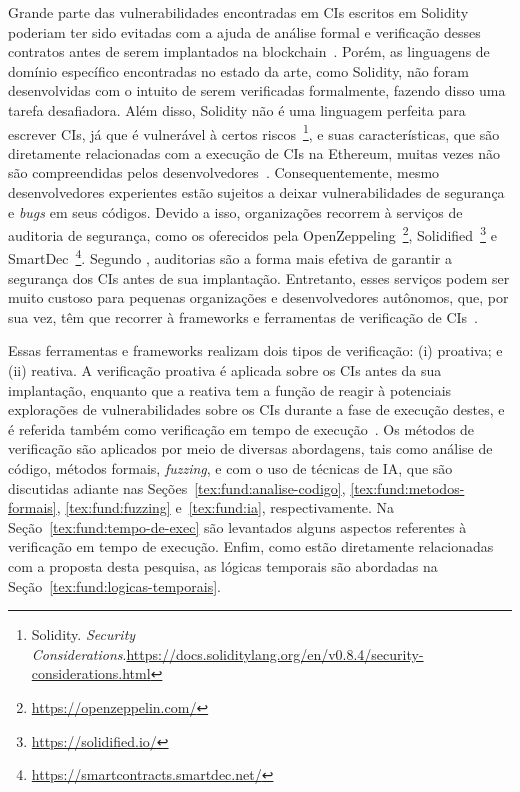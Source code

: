 Grande parte das vulnerabilidades encontradas em CIs escritos em Solidity poderiam ter sido evitadas com a ajuda de análise formal e verificação desses contratos antes de serem implantados na blockchain~\cite{singh2020survey-vulnerabilities-elsevier, chen2020survey-ethereum-acm}. Porém, as linguagens de domínio específico encontradas no estado da arte, como Solidity, não foram desenvolvidas com o intuito de serem verificadas formalmente, fazendo disso uma tarefa desafiadora. Além disso, Solidity não é uma linguagem perfeita para escrever CIs, já que é vulnerável à certos riscos~\footnote{Solidity. \textit{Security Considerations}.\url{https://docs.soliditylang.org/en/v0.8.4/security-considerations.html}}, e suas características, que são diretamente relacionadas com a execução de CIs na Ethereum, muitas vezes não são compreendidas pelos desenvolvedores~\cite{singh2020survey-vulnerabilities-elsevier, atzei2017survey-attacks-sok}. Consequentemente, mesmo desenvolvedores experientes estão sujeitos a deixar vulnerabilidades de segurança e \textit{bugs} em seus códigos. Devido a isso, organizações recorrem à serviços de auditoria de segurança, como os oferecidos pela OpenZeppeling~\footnote{\url{https://openzeppelin.com/}}, Solidified~\footnote{\url{https://solidified.io/}} e SmartDec~\footnote{\url{https://smartcontracts.smartdec.net/}}. Segundo , auditorias são a forma mais efetiva de garantir a segurança dos CIs antes de sua implantação. Entretanto, esses serviços podem ser muito custoso para pequenas organizações e desenvolvedores autônomos, que, por sua vez, têm que recorrer à frameworks e ferramentas de verificação de CIs~\cite{singh2020survey-vulnerabilities-elsevier}.

Essas ferramentas e frameworks realizam dois tipos de verificação: (i) proativa; e (ii) reativa. A verificação proativa é aplicada sobre os CIs antes da sua implantação, enquanto que a reativa tem a função de reagir à potenciais explorações de vulnerabilidades sobre os CIs durante a fase de execução destes, e é referida também como verificação em tempo de execução~\cite{chen2020survey-ethereum-acm}. Os métodos de verificação são aplicados por meio de diversas abordagens, tais como análise de código, métodos formais, \textit{fuzzing}, e com o uso de técnicas de IA, que são discutidas adiante nas Seções~\ref{tex:fund:analise-codigo}, \ref{tex:fund:metodos-formais}, \ref{tex:fund:fuzzing} e~\ref{tex:fund:ia}, respectivamente. Na Seção~\ref{tex:fund:tempo-de-exec} são levantados alguns aspectos referentes à verificação em tempo de execução. Enfim, como estão diretamente relacionadas com a proposta desta pesquisa, as lógicas temporais são abordadas na Seção~\ref{tex:fund:logicas-temporais}. 

